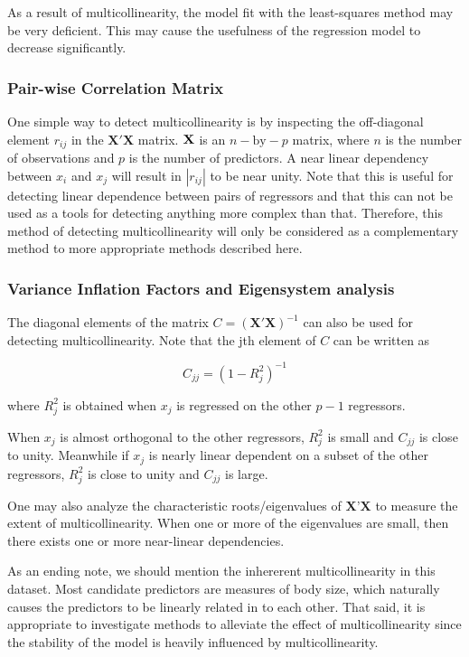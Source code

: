 \documentclass[11pt]{article}
\begin{document}
As a result of multicollinearity, the model fit with the least-squares method may be very deficient.
This may cause the usefulness of the regression model to decrease significantly. 

\subsubsection{Pair-wise Correlation Matrix}
\label{sec:org82dd0fc}

One simple way to detect multicollinearity is by inspecting the off-diagonal element \(r_{ij}\) in the 
\(\textbf{X}' \textbf{X}\) matrix. \(\textbf X\) is an \(n-\text{by}-p\) matrix, where \(n\) is the number of observations 
and \(p\) is the number of predictors.
A near linear dependency between \(x_i\) and \(x_j\) will result in \(|r_{ij}|\) to be near unity. Note that this is
useful for detecting linear dependence between pairs of regressors and that this can not be used as a tools for
detecting anything more complex than that. Therefore, this method of detecting multicollinearity will
only be considered as a complementary method to more appropriate methods described here.

\subsubsection{Variance Inflation Factors and Eigensystem analysis}
\label{sec:org28f936d}

The diagonal elements of the matrix \(C = (\textbf{X}' \textbf{X})^{-1}\) can also be used for detecting multicollinearity. Note that 
the jth element of \(C\) can be written as

\[
   C_{jj}=(1-R_j^2)^{-1}
   \]

where \(R_j^2\) is obtained when \(x_j\) is regressed on the other \(p-1\) regressors.

When \(x_j\) is almost orthogonal to the other regressors, \(R_j^2\) is small and \(C_{jj}\) is close to unity. Meanwhile 
if \(x_j\) is nearly linear dependent on a subset of the other regressors, \(R^2_j\) is close to unity and \(C_{jj}\)
is large.

One may also analyze the characteristic roots/eigenvalues of \(\textbf{X}’\textbf{X}\) to measure the extent of
multicollinearity. When one or more of the eigenvalues are small, then there exists one or more near-linear
dependencies. 

As an ending note, we should mention the inhererent multicollinearity in this dataset. Most candidate predictors 
are measures of body size, which naturally causes the predictors to be linearly related in to each other. That 
said, it is appropriate to investigate methods to alleviate the effect of multicollinearity since 
the stability of the model is heavily influenced by multicollinearity.
\end{document}

